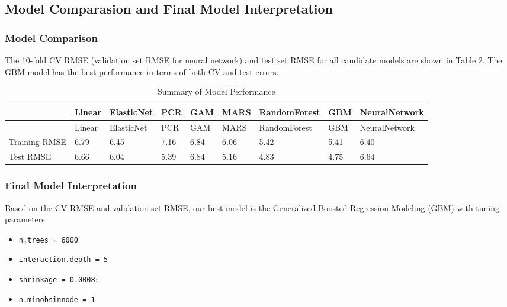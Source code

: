 \documentclass[
]{article}
\begin{document}
\hypertarget{model-comparasion-and-final-model-interpretation}{%
\subsection{Model Comparasion and Final Model
Interpretation}\label{model-comparasion-and-final-model-interpretation}}

\hypertarget{model-comparison}{%
\subsubsection{Model Comparison}\label{model-comparison}}

The 10-fold CV RMSE (validation set RMSE for neural network) and test
set RMSE for all candidate models are shown in Table 2. The GBM model
has the best performance in terms of both CV and test errors.

\begin{longtable}[]{@{}lllllllll@{}}
\caption{Summary of Model Performance}\tabularnewline
\toprule
& Linear & ElasticNet & PCR & GAM & MARS & RandomForest & GBM &
NeuralNetwork \\
\midrule
\endfirsthead
\toprule
& Linear & ElasticNet & PCR & GAM & MARS & RandomForest & GBM &
NeuralNetwork \\
\midrule
\endhead
Training RMSE & 6.79 & 6.45 & 7.16 & 6.84 & 6.06 & 5.42 & 5.41 & 6.40 \\
Test RMSE & 6.66 & 6.04 & 5.39 & 6.84 & 5.16 & 4.83 & 4.75 & 6.64 \\
\bottomrule
\end{longtable}

\hypertarget{final-model-interpretation}{%
\subsubsection{Final Model
Interpretation}\label{final-model-interpretation}}

Based on the CV RMSE and validation set RMSE, our best model is the
Generalized Boosted Regression Modeling (GBM) with tuning parameters:

\begin{itemize}
\item
  \texttt{n.trees\ =\ 6000}
\item
  \texttt{interaction.depth\ =\ 5}
\item
  \texttt{shrinkage\ =\ 0.0008}:
\item
  \texttt{n.minobsinnode\ =\ 1}
\end{itemize}
\end{document}
